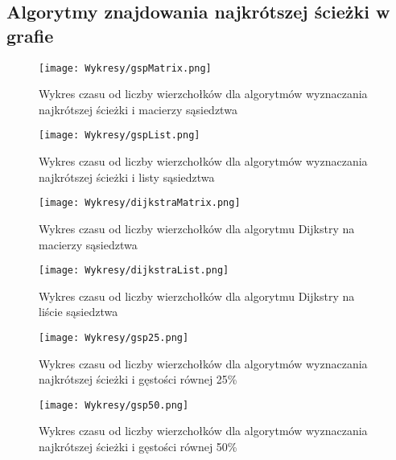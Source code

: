 \documentclass{article}
\begin{document}
        \subsection{Algorytmy znajdowania najkrótszej ścieżki w grafie}

            \begin{figure}[H]
                \centering
                \texttt{[image: Wykresy/gspMatrix.png]}
                \caption{Wykres czasu od liczby wierzchołków dla algorytmów wyznaczania najkrótszej ścieżki i macierzy sąsiedztwa}
            \end{figure}

            \begin{figure}[H]
                \centering
                \texttt{[image: Wykresy/gspList.png]}
                \caption{Wykres czasu od liczby wierzchołków dla algorytmów wyznaczania najkrótszej ścieżki i listy sąsiedztwa}
            \end{figure}

            \begin{figure}[H]
                \centering
                \texttt{[image: Wykresy/dijkstraMatrix.png]}
                \caption{Wykres czasu od liczby wierzchołków dla algorytmu Dijkstry na macierzy sąsiedztwa}
            \end{figure}

            \begin{figure}[H]
                \centering
                \texttt{[image: Wykresy/dijkstraList.png]}
                \caption{Wykres czasu od liczby wierzchołków dla algorytmu Dijkstry na liście sąsiedztwa}
            \end{figure}

            \begin{figure}[H]
                \centering
                \texttt{[image: Wykresy/gsp25.png]}
                \caption{Wykres czasu od liczby wierzchołków dla algorytmów wyznaczania najkrótszej ścieżki i gęstości równej 25\%}
            \end{figure}

            \begin{figure}[H]
                \centering
                \texttt{[image: Wykresy/gsp50.png]}
                \caption{Wykres czasu od liczby wierzchołków dla algorytmów wyznaczania najkrótszej ścieżki i gęstości równej 50\%}
            \end{figure}
\end{document}
